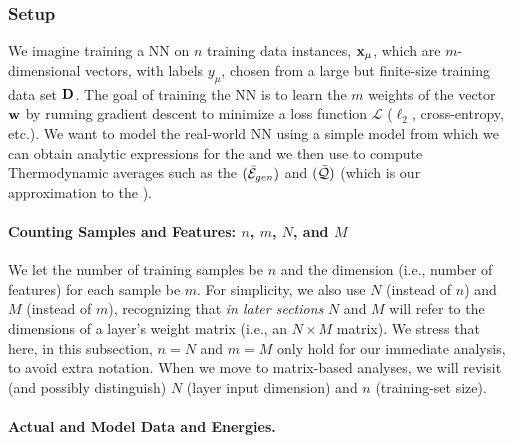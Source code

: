 \subsubsection{Setup}
\label{sxn:mathP_setup}



We imagine training a NN on $n$ training data instances, ${\mathbf{x}}_{\mu}$, which are $m$-dimensional vectors,
with labels $y_{\mu}$, chosen from a large but finite-size training data set $\mathbf{D}$.
The goal of training the NN is to learn the $m$ weights of the vector ${\mathbf{w}}$ by running gradient descent to minimize
a loss function $\mathcal{L}$ ($\ell_2$, cross-entropy, etc.). 
We want to model the real-world NN using a simple model from which we can obtain 
analytic expressions for the \emph{\FreeEnergy} and \emph{\GeneratingFunction} we then use to compute
Thermodynamic averages such as the \emph{\AverageGeneralizationError} $(\bar{\mathcal{E}}_{gen})$ and
\emph{\ModelQuality} $(\bar{\mathcal{Q}})$ (which is our approximation to the \emph{\AverageGeneralizationAccuracy}).

\paragraph{Counting Samples and Features: $n$, $m$, $N$, and $M$}
We let the number of training samples be $n$ and the dimension 
(i.e., number of features) for each sample be $m$.  For simplicity, 
we also use $N$ (instead of $n$) and $M$ (instead of $m$), recognizing that 
\emph{in later sections} $N$ and $M$ will refer to the dimensions 
of a layer’s weight matrix (i.e., an $N \times M$ matrix). 
We stress that here, in this subsection,  $n = N$ and $m = M$ only hold for our immediate analysis, 
to avoid extra notation. When we move to matrix-based analyses, 
we will revisit (and possibly distinguish) $N$ (layer input dimension) and $n$ (training-set size).

\paragraph{Actual and Model Data and Energies.}



